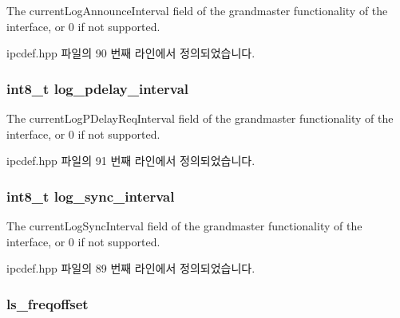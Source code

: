 The current\+Log\+Announce\+Interval field of the grandmaster functionality of the interface, or 0 if not supported. 



ipcdef.\+hpp 파일의 90 번째 라인에서 정의되었습니다.

\subsubsection[{\texorpdfstring{log\+\_\+pdelay\+\_\+interval}{log_pdelay_interval}}]{\setlength{\rightskip}{0pt plus 5cm}int8\+\_\+t log\+\_\+pdelay\+\_\+interval}\hypertarget{structg_ptp_time_data_a26544b553c0b251da8e632533f260a5d}{}\label{structg_ptp_time_data_a26544b553c0b251da8e632533f260a5d}


The current\+Log\+P\+Delay\+Req\+Interval field of the grandmaster functionality of the interface, or 0 if not supported. 



ipcdef.\+hpp 파일의 91 번째 라인에서 정의되었습니다.

\subsubsection[{\texorpdfstring{log\+\_\+sync\+\_\+interval}{log_sync_interval}}]{\setlength{\rightskip}{0pt plus 5cm}int8\+\_\+t log\+\_\+sync\+\_\+interval}\hypertarget{structg_ptp_time_data_a2d4950b4c6da4dfa67688dcaf6139c9d}{}\label{structg_ptp_time_data_a2d4950b4c6da4dfa67688dcaf6139c9d}


The current\+Log\+Sync\+Interval field of the grandmaster functionality of the interface, or 0 if not supported. 



ipcdef.\+hpp 파일의 89 번째 라인에서 정의되었습니다.

\subsubsection[{\texorpdfstring{ls\+\_\+freqoffset}{ls_freqoffset}}]{ ls\+\_\+freqoffset}\hypertarget{structg_ptp_time_data_a396f365f5e7c66610f076359c5d99c6e}{}\label{structg_ptp_time_data_a396f365f5e7c66610f076359c5d99c6e}


